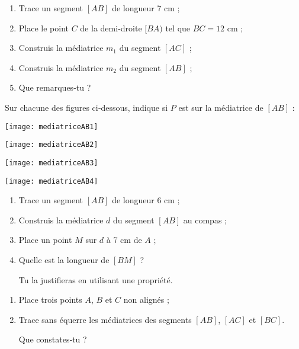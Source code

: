 \begin{exercice}
 \begin{enumerate}
  \item Trace un segment $[AB]$ de longueur 7 cm ;
  \item Place le point $C$ de la demi‑droite $[BA)$ tel que $BC = 12$ cm ;
  \item Construis la médiatrice $m_1$ du segment $[AC]$ ;
  \item Construis la médiatrice $m_2$ du segment $[AB]$ ;
  \item Que remarques‑tu ?
  \end{enumerate}
\end{exercice}


\begin{exercice}[Reconnaître]
Sur chacune des figures ci‑dessous, indique si $P$ est sur la médiatrice de $[AB]$ : \\[0.5em]
 \begin{colenumerate}{2}
  \item 
  
  \texttt{[image: mediatriceAB1]}
  \item 
  
  \texttt{[image: mediatriceAB2]}
  \item 
  
  \texttt{[image: mediatriceAB3]}
  \item 
  
  \texttt{[image: mediatriceAB4]}
  \end{colenumerate}
\end{exercice}
 
 
\begin{exercice}[Construction]
 \begin{enumerate}
 \item Trace un segment $[AB]$ de longueur 6 cm ;
 \item Construis la médiatrice $d$ du segment $[AB]$ au compas ;
 \item Place un point $M$ sur $d$ à 7 cm de $A$ ;
 \item Quelle est la longueur de $[BM]$ ? 
 
Tu la justifieras en utilisant une propriété.
  \end{enumerate}
\end{exercice}


\begin{exercice}
 \begin{enumerate}
 \item Place trois points $A$, $B$ et $C$ non alignés ;
 \item Trace sans équerre les médiatrices des segments $[AB]$, $[AC]$ et $[BC]$. 
 
 Que constates‑tu ?
 \end{enumerate}
\end{exercice}


